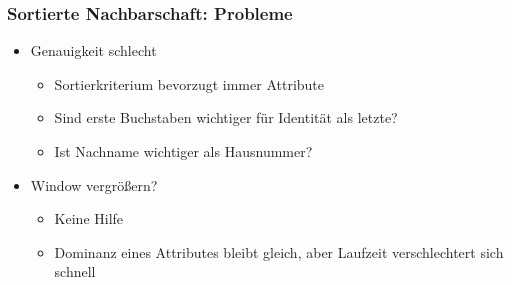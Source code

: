     
    \begin{frame}
    \frametitle{Sortierte Nachbarschaft: Probleme}
    
    \begin{itemize}
    \item Genauigkeit schlecht
    \begin{itemize}
    \item Sortierkriterium bevorzugt immer Attribute
    \item Sind erste Buchstaben wichtiger für Identität als letzte?
    \item Ist Nachname wichtiger als Hausnummer?
    \end{itemize}
    \item Window vergrößern?
    \begin{itemize}
    \item Keine Hilfe
    \item Dominanz eines Attributes bleibt gleich, aber Laufzeit
      verschlechtert sich schnell 
    \end{itemize}
    \end{itemize}
    
    \end{frame}
    
    
